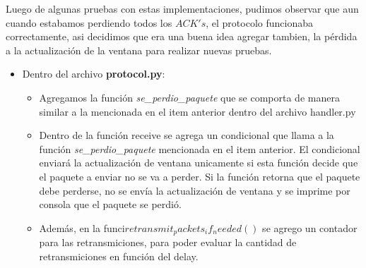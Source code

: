 Luego de algunas pruebas con estas implementaciones, pudimos observar que aun cuando estabamos perdiendo todos los $ACK's$, el protocolo funcionaba correctamente, asi decidimos que era una buena idea agregar tambien, la p\'erdida a la actualizaci\'on de la ventana para realizar nuevas pruebas.

\begin{itemize}

\item Dentro del archivo \textbf{protocol.py}:

\begin{itemize}

\item Agregamos la funci\'on \textit{se\_perdio\_paquete} que se comporta de manera similar a la mencionada en el item anterior dentro del archivo handler.py

\item Dentro de la función receive se agrega un condicional que llama a la funci\'on \textit{se\_perdio\_paquete} mencionada en el item anterior. El condicional enviar\'a la actualizaci\'on de ventana unicamente si esta funci\'on decide que el paquete a enviar no se va a perder. Si la funci\'on retorna que el paquete debe perderse, no se env\'ia la actualizaci\'on de ventana y se imprime por consola que el paquete se perdi\'o.

\item Adem\'as, en la funci\on $retransmit_packets_if_needed()$ se agrego un contador para las retransmiciones, para poder evaluar la cantidad de retransmiciones en funci\'on del delay.

\end{itemize}

\end{itemize}
 